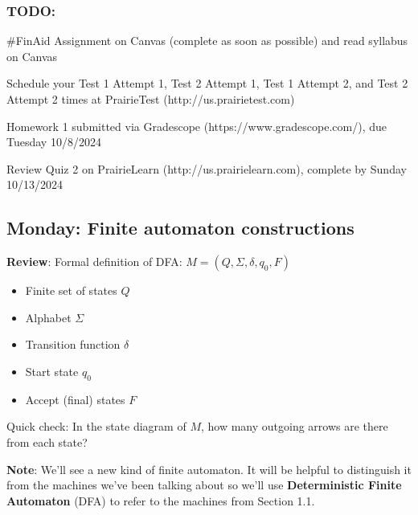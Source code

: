 \documentclass[12pt, oneside]{article}
\begin{document}
\vspace{-50pt}

\subsubsection*{TODO:}
\begin{list}{\itemsep-10pt}
   \item \#FinAid Assignment on Canvas (complete as soon as possible) and read syllabus on Canvas
   \item Schedule your Test 1 Attempt 1, Test 2 Attempt 1, Test 1 Attempt 2, and Test 2 Attempt 2 times 
   at PrairieTest (http://us.prairietest.com)
   \item Homework 1 submitted via Gradescope (https://www.gradescope.com/), due Tuesday 10/8/2024
   \item Review Quiz 2 on PrairieLearn (http://us.prairielearn.com), complete by Sunday 10/13/2024
\end{list}


\newpage
\subsection*{Monday: Finite automaton constructions}



{\bf Review}: Formal definition of DFA: $M = (Q, \Sigma, \delta, q_0, F)$ 

\begin{center}
\begin{multicols}{2}
\begin{itemize}
\setlength{\itemsep}{2pt}
\item Finite set of states $Q$
\item Alphabet $\Sigma$
\item Transition function $\delta$
\item Start state $q_0$
\item Accept (final) states $F$
\end{itemize}
\end{multicols}
\end{center}
Quick check: In the state diagram of $M$, how many outgoing arrows are there from each state?



{\bf Note}: We'll see a new kind of finite automaton. It will be helpful to distinguish it from the
machines we've been talking about so we'll use {\bf Deterministic Finite Automaton} (DFA) to refer to the machines 
from Section 1.1.
\end{document}
